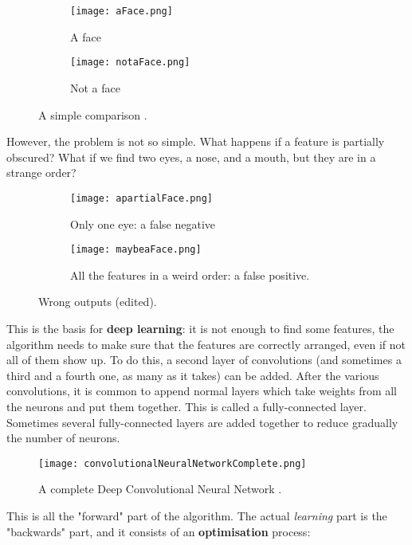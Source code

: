 \documentclass[titlepage]{article}
\theoremstyle{plain}
\theoremstyle{definition}
\begin{document}
		\begin{figure}[H]
			\centering
			\begin{subfigure}{.5\textwidth}
				\centering
				\texttt{[image: aFace.png]}
				\caption{A face}
				\label{fig:aFace}
			\end{subfigure}%
			\begin{subfigure}{.5\textwidth}
				\centering
				\texttt{[image: notaFace.png]}
				\caption{Not a face}
				\label{fig:notaFace}
			\end{subfigure}
			\caption{A simple comparison \cite{OnePunchMan}.}
			\label{fig:faceAndNoFace}
		\end{figure}
		However, the problem is not so simple. What happens if a feature is partially obscured? What if we find two eyes, a nose, and a mouth, but they are in a strange order?
		\begin{figure}[H]
			\centering
			\begin{subfigure}{.5\textwidth}
				\centering
				\texttt{[image: apartialFace.png]}
				\caption{Only one eye: a false negative}
				\label{fig:apartialFace}
			\end{subfigure}%
			\begin{subfigure}{.5\textwidth}
				\centering
				\texttt{[image: maybeaFace.png]}
				\caption{All the features in a weird order: a false positive.}
				\label{fig:maybeaFace}
			\end{subfigure}
			\caption{Wrong outputs \cite{OnePunchMan}(edited).}
			\label{fig:difficultFace}
		\end{figure}
		This is the basis for \textbf{deep learning}: it is not enough to find some features, the algorithm needs to make sure that the features are correctly arranged, even if not all of them show up. To do this, a second layer of convolutions (and sometimes a third and a fourth one, as many as it takes) can be added. After the various convolutions, it is common to append normal layers which take weights from all the neurons and put them together. This is called a fully-connected layer. Sometimes several fully-connected layers are added together to reduce gradually the number of neurons.
		\begin{figure}[H]
			\centering
			\texttt{[image: convolutionalNeuralNetworkComplete.png]}
			\caption{A complete Deep Convolutional Neural Network \cite{Nielsen}.}
			\label{fig:convolutionalNeuralNetworkComplete}
		\end{figure}
		This is all the "forward" part of the algorithm. The actual \textit{learning} part is the "backwards" part, and it consists of an \textbf{optimisation} process:
\end{document}
